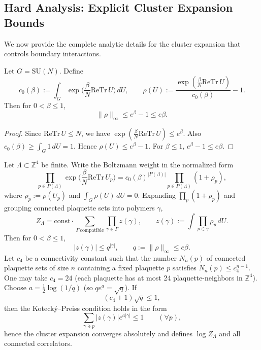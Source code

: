 \subsection{Hard Analysis: Explicit Cluster Expansion Bounds}

We now provide the complete analytic details for the cluster expansion that controls boundary interactions.

\begin{proposition}
Let $G=\mathrm{SU}(N)$. Define
\[
c_0(\beta):=\int_G \exp\Big(\frac{\beta}{N}\mathrm{Re}\mathrm{Tr}\,U\Big)\,dU,\qquad
\rho(U):=\frac{\exp(\frac{\beta}{N}\mathrm{Re}\mathrm{Tr}\,U)}{c_0(\beta)}-1.
\]
Then for $0<\beta\le 1$,
\[
\|\rho\|_\infty \le e^\beta-1 \le e\beta.
\]
\end{proposition}

\begin{proof}
Since $\mathrm{Re}\mathrm{Tr}\,U\le N$, we have $\exp(\frac{\beta}{N}\mathrm{Re}\mathrm{Tr}\,U)\le e^\beta$. Also $c_0(\beta)\ge \int_G 1\,dU=1$. Hence $\rho(U)\le e^\beta-1$. For $\beta\le1$, $e^\beta-1\le e\beta$.
\end{proof}

\begin{theorem}
\label{thm:polymer-convergence}
Let $\Lambda\subset\mathbb Z^4$ be finite. Write the Boltzmann weight in the normalized form
\[
\prod_{p\in P(\Lambda)} \exp\Big(\frac{\beta}{N}\mathrm{Re}\mathrm{Tr}\,U_p\Big)
= c_0(\beta)^{|P(\Lambda)|}\prod_{p\in P(\Lambda)} (1+\rho_p),
\]
where $\rho_p:=\rho(U_p)$ and $\int_G \rho(U)\,dU=0$. Expanding $\prod_p(1+\rho_p)$ and grouping connected plaquette sets into polymers $\gamma$,
\[
Z_\Lambda = \text{const}\cdot \sum_{\Gamma\ \text{compatible}} \prod_{\gamma\in\Gamma} z(\gamma),
\qquad
z(\gamma):=\int \prod_{p\in\gamma}\rho_p\,dU.
\]
Then for $0<\beta\le1$,
\[
|z(\gamma)|\le q^{|\gamma|},\qquad q:=\|\rho\|_\infty\le e\beta.
\]
Let $c_4$ be a connectivity constant such that the number $N_n(p)$ of connected plaquette sets of size $n$ containing a fixed plaquette $p$ satisfies $N_n(p)\le c_4^{n-1}$. One may take $c_4=24$ (each plaquette has at most 24 plaquette-neighbors in $\mathbb Z^4$).
Choose $a=\frac12\log(1/q)$ (so $q e^a=\sqrt{q}$). If
\[
(c_4+1)\sqrt{q}\le 1,
\]
then the Kotecký–Preiss condition holds in the form
\[
\sum_{\gamma\ni p} |z(\gamma)|e^{a|\gamma|}\le 1\qquad(\forall p),
\]
hence the cluster expansion converges absolutely and defines $\log Z_\Lambda$ and all connected correlators.
\end{theorem}


